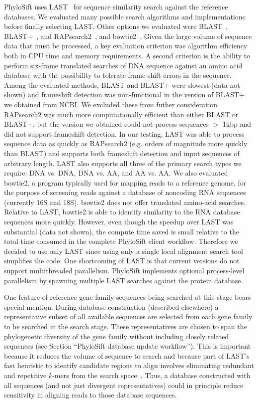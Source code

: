 \documentclass[10pt]{article}
\begin{document}
PhyloSift uses LAST~\cite{Kiełbasa2011} for sequence similarity search against the reference databases.
We evaluated many possible search algorithms and implementations before finally selecting LAST.
Other options we evaluated were BLAST~\cite{Altschul1997}, BLAST+~\cite{Camacho2009}, and RAPsearch2~\cite{Zhao2011}, and bowtie2~\cite{Langmead2009}.
Given the large volume of sequence data that must be processed, a key evaluation criterion was algorithm efficiency both in CPU time and memory requirements.
A second criterion is the ability to perform six-frame translated searches of {DNA} sequence against an amino acid database with the possibility to tolerate frame-shift errors in the sequence.
Among the evaluated methods, BLAST and BLAST+ were slowest (data not shown) and frameshift detection was non-functional in the version of BLAST+ we obtained from NCBI. We excluded these from futher consideration.
RAPsearch2 was much more computationally efficient than either BLAST or BLAST+, but the version we obtained could not process sequences $>$ 1kbp and did not support frameshift detection.
In our testing, LAST was able to process sequence data as quickly as RAPsearch2 (e.g. orders of magnitude more quickly than BLAST) and supports both frameshift detection and input sequences of arbitrary length.
LAST also supports all three of the primary search types we require: {DNA} vs. {DNA}, {DNA} vs. AA, and AA vs. AA.
We also evaluated bowtie2, a program typically used for mapping reads to a reference genome, for the purpose of screening reads against a database of noncoding {RNA} sequences (currently 16S and 18S).
bowtie2 does not offer translated amino-acid searches.
Relative to LAST, bowtie2 is able to identify similarity to the {RNA} database sequences more quickly.
However, even though the speedup over LAST was substantial (data not shown), the compute time saved is small relative to the total time consumed in the complete PhyloSift client workflow.
Therefore we decided to use only LAST since using only a single local alignment search tool simplifies the code.
One shortcoming of LAST is that current versions do not support multithreaded parallelism.
PhyloSift implements optional process-level parallelism by spawning multiple LAST searches against the protein database.

One feature of reference gene family sequences being searched at this stage bears special mention.
During database construction (described elsewhere) a representative subset of all available sequences are selected from each gene family to be searched in the search stage.
These representatives are chosen to span the phylogenetic diversity of the gene family without including closely related sequences (see Section ``PhyloSift database update workflow'').
This is important because it reduces the volume of sequence to search and because part of LAST's fast heuristic to identify candidate regions to align involves eliminating redundant and repetitive $k$-mers from the search space~\cite{Kiełbasa2011}.
Thus, a database constructed with all sequences (and not just divergent representatives) could in principle reduce sensitivity in aligning reads to those database sequences.
\end{document}
